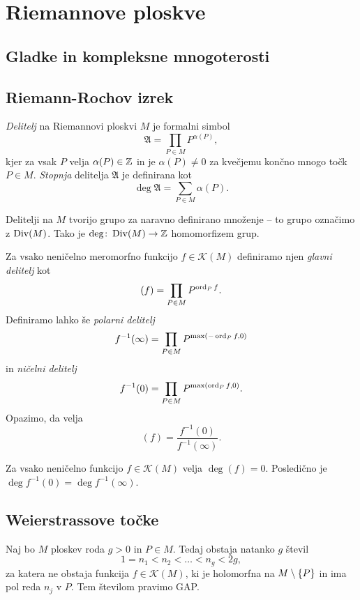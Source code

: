 \section{Riemannove ploskve}

\subsection{Gladke in kompleksne mnogoterosti}


\subsection{Riemann-Rochov izrek}

\begin{definicija}
\emph{Delitelj} na Riemannovi ploskvi $M$ je formalni simbol
\[
\mathfrak{A} = \prod_{P \in M} P^{\alpha(P)},
\]
kjer za vsak $P$ velja $\alpha(P) \in \mathbb{Z}$ in je $\alpha(P) \ne 0$
za kvečjemu končno mnogo točk $P \in M$. \emph{Stopnja} delitelja
$\mathfrak{A}$ je definirana kot
\[
\deg \mathfrak{A} = \sum_{P \in M} \alpha(P).
\]
\end{definicija}

Delitelji na $M$ tvorijo grupo za naravno definirano množenje --
to grupo označimo z $\operatorname{Div}(M)$. Tako je
$\deg \colon \operatorname{Div}(M) \to \mathbb{Z}$ homomorfizem grup.

Za vsako neničelno meromorfno funkcijo $f \in \mathscr{K}(M)$
definiramo njen \emph{glavni delitelj} kot
\[
(f) = \prod_{P \in M} P^{\operatorname{ord}_P f}.
\]
Definiramo lahko še \emph{polarni delitelj}
\[
f^{-1}(\infty) = \prod_{P \in M} P^{\max(-\operatorname{ord}_P f, 0)}
\]
in \emph{ničelni delitelj}
\[
f^{-1}(0) = \prod_{P \in M} P^{\max(\operatorname{ord}_P f, 0)}.
\]
Opazimo, da velja
\[
(f) = \frac{f^{-1}(0)}{f^{-1}(\infty)}.
\]

\begin{lema}
Za vsako neničelno funkcijo $f \in \mathscr{K}(M)$ velja
$\deg (f) = 0$. Posledično je
$\deg f^{-1}(0) = \deg f^{-1}(\infty)$.
\end{lema}


\subsection{Weierstrassove točke}

\begin{izrek}
Naj bo $M$ ploskev roda $g > 0$ in $P \in M$. Tedaj obstaja
natanko $g$ števil
\[
1 = n_1 < n_2 < \dots < n_g < 2g,
\]
za katera ne obstaja funkcija $f \in \mathscr{K}(M)$, ki je
holomorfna na $M \setminus \left\{P\right\}$ in ima pol reda $n_j$ v $P$.
Tem številom pravimo GAP.
\end{izrek}

